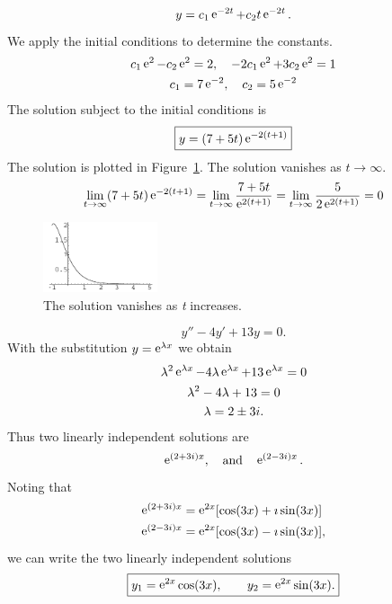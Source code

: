 {\begin{Solution}
\begin{enumerate}
    \[
    y = c_1 \mathop{\mathrm{e}}\nolimits^{-2 t} + c_2 t \mathop{\mathrm{e}}\nolimits^{-2 t}.
    \]
    We apply the initial conditions to determine the constants.
    \begin{gather*}
      c_1 \mathop{\mathrm{e}}\nolimits^{2} - c_2 \mathop{\mathrm{e}}\nolimits^{2} = 2, \quad -2 c_1 \mathop{\mathrm{e}}\nolimits^{2} + 3 c_2 \mathop{\mathrm{e}}\nolimits^{2} = 1 \\
      c_1 = 7 \mathop{\mathrm{e}}\nolimits^{-2}, \quad c_2 = 5 \mathop{\mathrm{e}}\nolimits^{-2}
    \end{gather*}
    The solution subject to the initial conditions is
    \[
    \boxed{
      y = (7 + 5 t) \mathop{\mathrm{e}}\nolimits^{-2 (t+1)} 
      }
    \]
    The solution is plotted in Figure~\ref{figure y4y4y}.  The solution vanishes
    as $t \to \infty$.
    \[
    \lim_{t \to \infty} (7 + 5 t) \mathop{\mathrm{e}}\nolimits^{-2 (t+1)} 
    = \lim_{t \to \infty} \frac{7 + 5 t}{\mathop{\mathrm{e}}\nolimits^{2 (t+1)}}
    = \lim_{t \to \infty} \frac{5}{2 \mathop{\mathrm{e}}\nolimits^{2 (t+1)}}
    = 0
    \]
    \begin{figure}[tb!]
      \begin{center}
        \includegraphics[width=0.3\textwidth]{ode/techniques_linear/y4y4y}
      \end{center}
      \caption{The solution vanishes as \textit{t} increases.}
      \label{figure y4y4y}
    \end{figure}
  \end{enumerate}
\end{Solution}











\begin{Solution}
  \label{solution y-4y+13y}
  \[ 
  y'' - 4 y' + 13 y = 0. 
  \]
  With the substitution $y = \mathop{\mathrm{e}}\nolimits^{\lambda x}$ we obtain
  \begin{gather*}
    \lambda^2 \mathop{\mathrm{e}}\nolimits^{\lambda x} - 4 \lambda \mathop{\mathrm{e}}\nolimits^{\lambda x} + 13 \mathop{\mathrm{e}}\nolimits^{\lambda x} = 0 \\
    \lambda^2 - 4 \lambda + 13 = 0 \\
    \lambda = 2 \pm 3 i.
  \end{gather*}
  Thus two linearly independent solutions are
  \[ 
  \mathop{\mathrm{e}}\nolimits^{(2 + 3i)x}, \quad \mathrm{and} \quad \mathop{\mathrm{e}}\nolimits^{(2-3i)x}. 
  \]
  Noting that
  \begin{align*}
    \mathop{\mathrm{e}}\nolimits^{(2+3i)x} &= \mathop{\mathrm{e}}\nolimits^{2x} [\cos (3x) + \imath \sin(3x)] \\
    \mathop{\mathrm{e}}\nolimits^{(2-3i)x} &= \mathop{\mathrm{e}}\nolimits^{2x} [\cos (3x) - \imath \sin(3x)],
  \end{align*}
  we can write the two linearly independent solutions
  \[ 
  \boxed{ 
    y_1 = \mathop{\mathrm{e}}\nolimits^{2x} \cos (3x), \qquad y_2 = \mathop{\mathrm{e}}\nolimits^{2x} \sin(3x).
    } 
  \]
\end{Solution}






}
